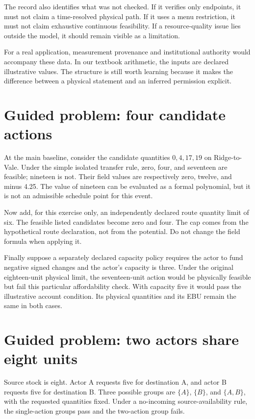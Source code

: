 The record also identifies what was not checked. If it verifies only endpoints, it must not claim a time-resolved physical path. If it uses a menu restriction, it must not claim exhaustive continuous feasibility. If a resource-quality issue lies outside the model, it should remain visible as a limitation.

For a real application, measurement provenance and institutional authority would accompany these data. In our textbook arithmetic, the inputs are declared illustrative values. The structure is still worth learning because it makes the difference between a physical statement and an inferred permission explicit.

\section{Guided problem: four candidate actions}
At the main baseline, consider the candidate quantities \(0,4,17,19\) on Ridge-to-Vale. Under the simple isolated transfer rule, zero, four, and seventeen are feasible; nineteen is not. Their field values are respectively zero, twelve, and minus 4.25. The value of nineteen can be evaluated as a formal polynomial, but it is not an admissible schedule point for this event.

Now add, for this exercise only, an independently declared route quantity limit of six. The feasible listed candidates become zero and four. The cap comes from the hypothetical route declaration, not from the potential. Do not change the field formula when applying it.

Finally suppose a separately declared capacity policy requires the actor to fund negative signed changes and the actor's capacity is three. Under the original eighteen-unit physical limit, the seventeen-unit action would be physically feasible but fail this particular affordability check. With capacity five it would pass the illustrative account condition. Its physical quantities and its EBU remain the same in both cases.

\section{Guided problem: two actors share eight units}
Source stock is eight. Actor A requests five for destination A, and actor B requests five for destination B. Three possible groups are \(\{A\}\), \(\{B\}\), and \(\{A,B\}\), with the requested quantities fixed. Under a no-incoming source-availability rule, the single-action groups pass and the two-action group fails.

